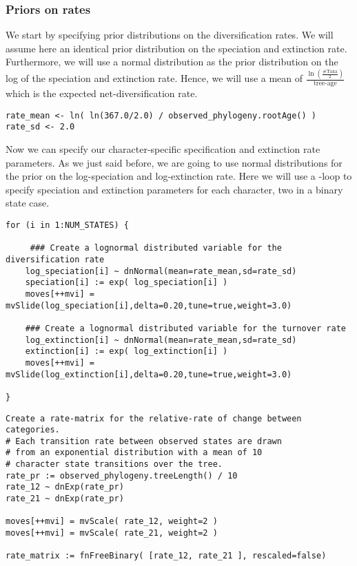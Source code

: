 \subsubsection{Priors on rates}
We start by specifying prior distributions on the diversification rates.
We will assume here an identical prior distribution on the speciation and extinction rate.
Furthermore, we will use a normal distribution as the prior distribution on the log of the speciation and extinction rate.
Hence, we will use a mean of $\frac{\ln(\frac{\text{\#Taxa}}{2})}{\text{tree-age}}$ which is the expected net-diversification rate.
{\tt \begin{snugshade*}
\begin{lstlisting}
rate_mean <- ln( ln(367.0/2.0) / observed_phylogeny.rootAge() )
rate_sd <- 2.0
\end{lstlisting}
\end{snugshade*}}
Now we can specify our character-specific specification and extinction rate parameters.
As we just said before, we are going to use normal distributions for the prior on the log-speciation and log-extinction rate.
Here we will use a -loop to specify speciation and extinction parameters for each character, \EG two in a binary state case.
{\tt \begin{snugshade*}
\begin{lstlisting}
for (i in 1:NUM_STATES) {
    
     ### Create a lognormal distributed variable for the diversification rate
    log_speciation[i] ~ dnNormal(mean=rate_mean,sd=rate_sd) 
    speciation[i] := exp( log_speciation[i] )
    moves[++mvi] = mvSlide(log_speciation[i],delta=0.20,tune=true,weight=3.0)

    ### Create a lognormal distributed variable for the turnover rate
    log_extinction[i] ~ dnNormal(mean=rate_mean,sd=rate_sd) 
    extinction[i] := exp( log_extinction[i] )
    moves[++mvi] = mvSlide(log_extinction[i],delta=0.20,tune=true,weight=3.0)

}
\end{lstlisting}
\end{snugshade*}}

{\tt \begin{snugshade*}
\begin{lstlisting}
Create a rate-matrix for the relative-rate of change between categories.
# Each transition rate between observed states are drawn
# from an exponential distribution with a mean of 10
# character state transitions over the tree. 
rate_pr := observed_phylogeny.treeLength() / 10
rate_12 ~ dnExp(rate_pr)
rate_21 ~ dnExp(rate_pr)

moves[++mvi] = mvScale( rate_12, weight=2 )
moves[++mvi] = mvScale( rate_21, weight=2 )

rate_matrix := fnFreeBinary( [rate_12, rate_21 ], rescaled=false)
\end{lstlisting}
\end{snugshade*}}


